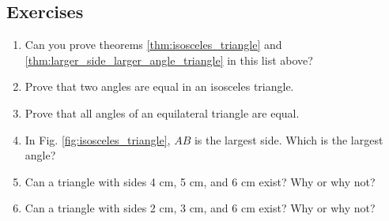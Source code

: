 \documentclass[11pt]{article}
\begin{document}
\subsection{Exercises}
\begin{framed}
    \begin{enumerate}
        \item Can you prove theorems \ref{thm:isosceles_triangle} and \ref{thm:larger_side_larger_angle_triangle} in this list above?
        \item Prove that two angles are equal in an isosceles triangle.
        \item Prove that all angles of an equilateral triangle are equal.
        \item In Fig. \ref{fig:isosceles_triangle}, $AB$ is the largest side. Which is the largest angle?
        \item Can a triangle with sides 4 cm, 5 cm, and 6 cm exist? Why or why not?
        \item Can a triangle with sides 2 cm, 3 cm, and 6 cm exist? Why or why not?
    \end{enumerate}
\end{framed}
\end{document}
